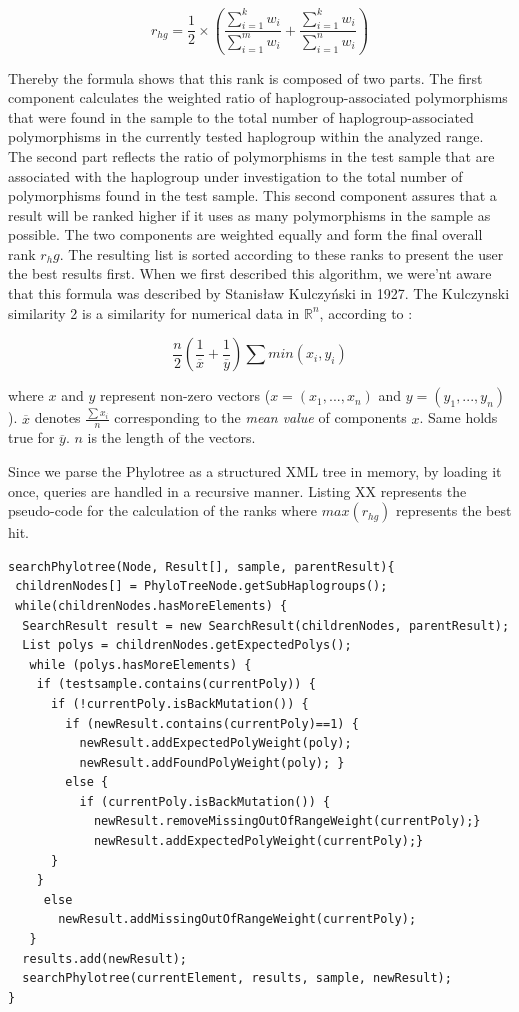 \begin{equation}
	r_{hg} = \frac{1}{2} \times \left(\frac{\sum^{k}_{i=1} w_i}{\sum^{m}_{i=1} w_i} + \frac{\sum^{k}_{i=1} w_i}{\sum^{n}_{i=1} w_i}\right)
\end{equation}

Thereby the formula shows that this rank is composed of two parts. The first component calculates the weighted ratio of haplogroup-associated polymorphisms that were found in the sample to the total number of haplogroup-associated polymorphisms in the currently tested haplogroup within the analyzed range. The second part reflects the ratio of polymorphisms in the test sample that are associated with the haplogroup under investigation to the total number of polymorphisms found in the test sample. This second component assures that a result will be ranked higher if it uses as many polymorphisms in the sample as possible. The two components are weighted equally and form the final overall rank $r_hg$. The resulting list is sorted according to these ranks to present the user the best results first. When we first described this algorithm, we were'nt aware that this formula was described by Stanisław Kulczyński in 1927. The Kulczynski similarity 2 is a similarity for numerical data in $\mathbb{R}^n$, according to \cite{Deza2009}:
 
\begin{equation}
\frac{n}{2}\left(\frac{1}{\overline x}+\frac{1}{\overline y}\right) \sum{min(x_i, y_i)}
\end{equation}

where $x$ and $y$ represent non-zero vectors ($x=(x_1,...,x_n)$ and $y=(y_1,...,y_n)$). $\overline x$ denotes $\frac{\sum{x_i}}{n}$ corresponding to the \textit{mean value} of components $x$. Same holds true for $\overline y$. $n$ is the length of the vectors.

Since we parse the Phylotree as a structured XML tree in memory, by loading it once, queries are handled in a recursive manner. Listing XX represents the pseudo-code for the calculation of the ranks where $max(r_{hg})$ represents the best hit.

\begin{lstlisting}
searchPhylotree(Node, Result[], sample, parentResult){
 childrenNodes[] = PhyloTreeNode.getSubHaplogroups();
 while(childrenNodes.hasMoreElements) {
  SearchResult result = new SearchResult(childrenNodes, parentResult);
  List polys = childrenNodes.getExpectedPolys();
   while (polys.hasMoreElements) {
    if (testsample.contains(currentPoly)) {
      if (!currentPoly.isBackMutation()) {
        if (newResult.contains(currentPoly)==1) {
          newResult.addExpectedPolyWeight(poly);
          newResult.addFoundPolyWeight(poly); }
        else {
          if (currentPoly.isBackMutation()) {
            newResult.removeMissingOutOfRangeWeight(currentPoly);}
            newResult.addExpectedPolyWeight(currentPoly);}
      }
    }
     else
       newResult.addMissingOutOfRangeWeight(currentPoly);
   }
  results.add(newResult);
  searchPhylotree(currentElement, results, sample, newResult);
}
\end{lstlisting}

